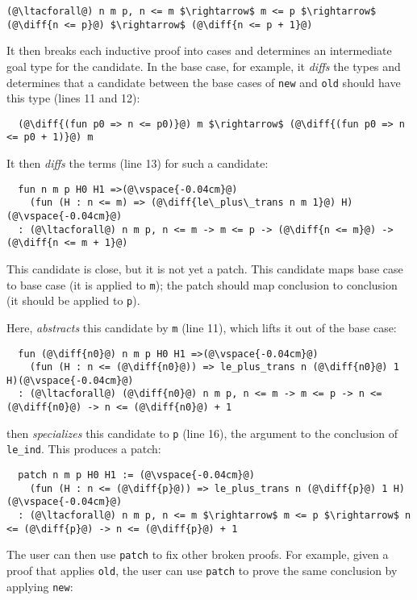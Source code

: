\begin{lstlisting}[language=coq]
  (@\ltacforall@) n m p, n <= m $\rightarrow$ m <= p $\rightarrow$ (@\diff{n <= p}@) $\rightarrow$ (@\diff{n <= p + 1}@)
\end{lstlisting}
It then breaks each inductive proof into cases and determines an intermediate goal type for the candidate.
In the base case, for example, it \textit{diffs} the types and determines that a candidate
between the base cases of \lstinline{new} and \lstinline{old} should have this type (lines 11 and 12):

\begin{lstlisting}
  (@\diff{(fun p0 => n <= p0)}@) m $\rightarrow$ (@\diff{(fun p0 => n <= p0 + 1)}@) m
\end{lstlisting}
It then \textit{diffs} the terms (line 13) for such a candidate:

\begin{lstlisting}
  fun n m p H0 H1 =>(@\vspace{-0.04cm}@)
    (fun (H : n <= m) => (@\diff{le\_plus\_trans n m 1}@) H)(@\vspace{-0.04cm}@)
  : (@\ltacforall@) n m p, n <= m -> m <= p -> (@\diff{n <= m}@) -> (@\diff{n <= m + 1}@)
\end{lstlisting}

This candidate is close, but it is not yet a patch. This candidate
maps base case to base case (it is applied to \lstinline{m}); the patch should map conclusion to conclusion (it should
be applied to \lstinline{p}).

Here, \sysname \textit{abstracts} this candidate by \lstinline{m} (line 11), which lifts it out of the base case:

\begin{lstlisting}
  fun (@\diff{n0}@) n m p H0 H1 =>(@\vspace{-0.04cm}@)
    (fun (H : n <= (@\diff{n0}@)) => le_plus_trans n (@\diff{n0}@) 1 H)(@\vspace{-0.04cm}@)
  : (@\ltacforall@) (@\diff{n0}@) n m p, n <= m -> m <= p -> n <= (@\diff{n0}@) -> n <= (@\diff{n0}@) + 1
\end{lstlisting}
\sysname then \textit{specializes} this candidate to \lstinline{p} (line 16), the argument
to the conclusion of \lstinline{le_ind}. This produces a patch:

\begin{lstlisting}
  patch n m p H0 H1 := (@\vspace{-0.04cm}@)
    (fun (H : n <= (@\diff{p}@)) => le_plus_trans n (@\diff{p}@) 1 H)(@\vspace{-0.04cm}@)
  : (@\ltacforall@) n m p, n <= m $\rightarrow$ m <= p $\rightarrow$ n <= (@\diff{p}@) -> n <= (@\diff{p}@) + 1
\end{lstlisting}
The user can then use \lstinline{patch} to fix other broken proofs.
For example, given a proof that applies \lstinline{old}, the user can use \lstinline{patch} to prove the same conclusion
by applying \lstinline{new}:

